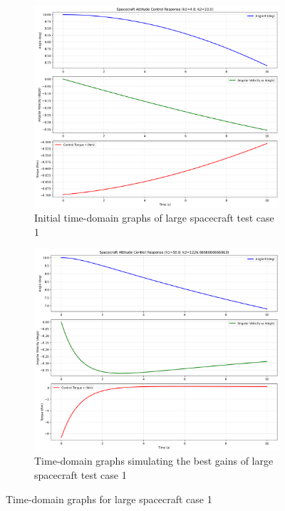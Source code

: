 \documentclass{ifacconf}
\begin{document}
\begin{figure}[H]
    \label{Fig. 1}
    \centering
    \begin{subfigure}[b]{0.48\columnwidth}
        \label{Fig. 1.A}
        \centering
        \includegraphics[width=\linewidth]{time_domain/base_time_domain(1).pdf}
        \caption{Initial time-domain graphs of large spacecraft test case 1}
        \label{fig:subfig1}
    \end{subfigure}
    \hfill
    \begin{subfigure}[b]{0.48\columnwidth}
        \label{Fig. 1.B}
        \centering
        \includegraphics[width=\linewidth]{best_gains/time_domain/best_time_domain(1).pdf}
        \caption{Time-domain graphs simulating the best gains of large spacecraft test case 1}
        \label{fig:subfig2}
    \end{subfigure}
    \caption{Time-domain graphs for large spacecraft case 1}
    \label{fig:combined}
\end{figure}
\end{document}
